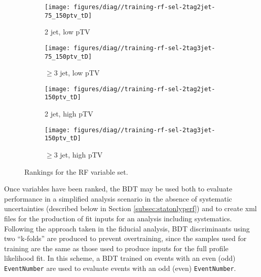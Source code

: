 \begin{figure}[!htbp]\captionsetup{justification=centering}
  \centering
\begin{subfigure}[t]{0.49\textwidth}\centering\texttt{[image: figures/diag//training-rf-sel-2tag2jet-75\_150ptv\_tD]}\caption{2 jet, low pTV}\end{subfigure}
\begin{subfigure}[t]{0.49\textwidth}\centering\texttt{[image: figures/diag//training-rf-sel-2tag3jet-75\_150ptv\_tD]}\caption{$\ge3$ jet, low pTV}\end{subfigure}
\begin{subfigure}[t]{0.49\textwidth}\centering\texttt{[image: figures/diag//training-rf-sel-2tag2jet-150ptv\_tD]}\caption{2 jet, high pTV}\end{subfigure}
\begin{subfigure}[t]{0.49\textwidth}\centering\texttt{[image: figures/diag//training-rf-sel-2tag3jet-150ptv\_tD]}\caption{$\ge3$ jet, high pTV}\end{subfigure}
  \caption{Rankings for the RF variable set.}
  \label{fig:rf-sel-Ranking}
\end{figure}

Once variables have been ranked, the BDT may be used both to evaluate performance in a simplified analysis scenario in the absence of systematic uncertainties (described below in Section \ref{subsec:statonlyperf}) and to create xml files for the production of fit inputs for an analysis including systematics.  Following the approach taken in the fiducial analysis, BDT discriminants using two ``k-folds'' are produced to prevent overtraining, since the samples used for training are the same as those used to produce inputs for the full profile likelihood fit.  In this scheme, a BDT trained on events with an even (odd) \texttt{EventNumber} are used to evaluate events with an odd (even) \texttt{EventNumber}.

